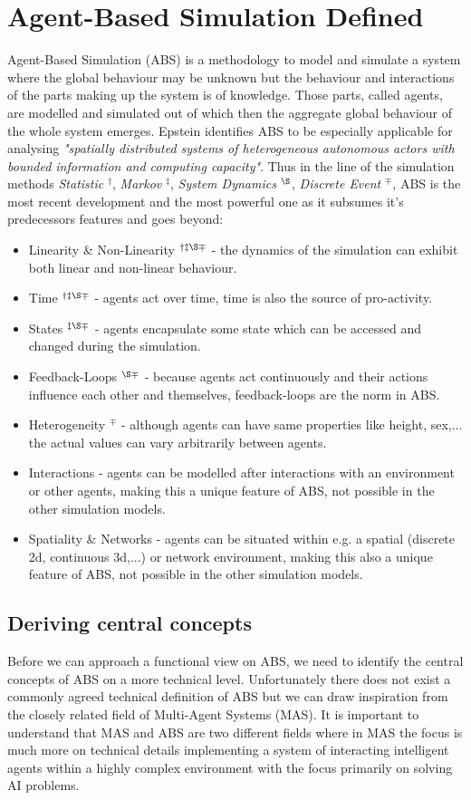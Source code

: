 \section{Agent-Based Simulation Defined}
Agent-Based Simulation (ABS) is a methodology to model and simulate a system where the global behaviour may be unknown but the behaviour and interactions of the parts making up the system is of knowledge. Those parts, called agents, are modelled and simulated out of which then the aggregate global behaviour of the whole system emerges. Epstein \cite{epstein_generative_2012} identifies ABS to be especially applicable for analysing \textit{"spatially distributed systems of heterogeneous autonomous actors with bounded information and computing capacity"}. Thus in the line of the simulation methods \textit{Statistic} $^\dag$, \textit{Markov} $^\ddag$, \textit{System Dynamics} $^\S$, \textit{Discrete Event} $^\mp$, ABS is the most recent development and the most powerful one as it subsumes it's predecessors features and goes beyond:

\begin{itemize}
	\item Linearity \& Non-Linearity $^{\dag \ddag \S \mp}$ - the dynamics of the simulation can exhibit both linear and non-linear behaviour. 
	\item Time $^{\dag \ddag \S \mp}$ - agents act over time, time is also the source of pro-activity.
	\item States $^{\ddag \S \mp}$ - agents encapsulate some state which can be accessed and changed during the simulation.
	\item Feedback-Loops $^{\S \mp}$ - because agents act continuously and their actions influence each other and themselves, feedback-loops are the norm in ABS. 
	\item Heterogeneity $^{\mp}$ - although agents can have same properties like height, sex,... the actual values can vary arbitrarily between agents.
	\item Interactions - agents can be modelled after interactions with an environment or other agents, making this a unique feature of ABS, not possible in the other simulation models.
	\item Spatiality \& Networks - agents can be situated within e.g. a spatial (discrete 2d, continuous 3d,...) or network environment, making this also a unique feature of ABS, not possible in the other simulation models.
\end{itemize}

\subsection{Deriving central concepts}
Before we can approach a functional view on ABS, we need to identify the central concepts of ABS on a more technical level. Unfortunately there does not exist a commonly agreed technical definition of ABS but we can draw inspiration from the closely related field of Multi-Agent Systems (MAS). It is important to understand that MAS and ABS are two different fields where in MAS the focus is much more on technical details implementing a system of interacting intelligent agents within a highly complex environment with the focus primarily on solving AI problems.

